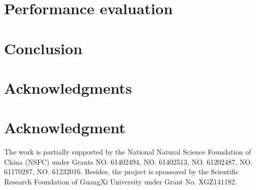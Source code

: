 \documentclass[10pt,journal,finalsubmission,compsoc]{IEEEtran}
\begin{document}
\section{Performance evaluation}
\label{performance_evaluation}




\section{Conclusion}
\label{conclusion}


\balance

\ifCLASSOPTIONcompsoc

  \section*{Acknowledgments}
\else

  \section*{Acknowledgment}
\fi
The work is partially supported by the National Natural Science Foundation of China (NSFC) under Grants NO. 61402494, NO. 61402513, NO. 61202487, NO. 61170287, NO. 61232016. Besides, the project is sponsored by the Scientific Research Foundation of GuangXi University under Grant No. XGZ141182.




\end{document}
